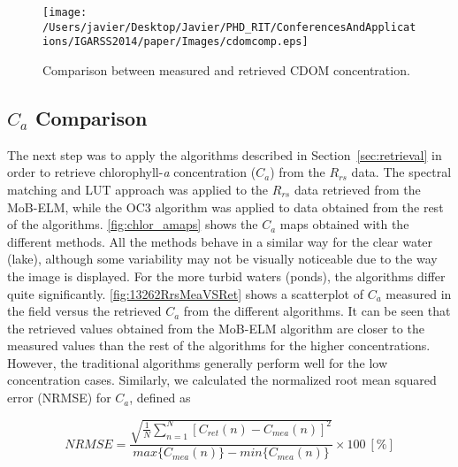 \begin{figure}[htb]
\centering
    \texttt{[image: /Users/javier/Desktop/Javier/PHD\_RIT/ConferencesAndApplications/IGARSS2014/paper/Images/cdomcomp.eps]}    
    \caption{Comparison between measured and retrieved CDOM concentration.}
    \label{fig:cdomcomp} 
\end{figure}  

\subsection{$C_a$ Comparison}
The next step was to apply the algorithms described in Section~\ref{sec:retrieval} in order to retrieve chlorophyll-{\it a} concentration ($C_a$) from the $R_{rs}$ data. The spectral matching and LUT approach was applied to the $R_{rs}$ data retrieved from the MoB-ELM, while the OC3 algorithm was applied to data obtained from the rest of the algorithms. \autoref{fig:chlor_amaps} shows the $C_a$ maps obtained with the different methods. All the methods behave in a similar way for the clear water (lake), although some variability may not be visually noticeable due to the way the image is displayed. For the more turbid waters (ponds), the algorithms differ quite significantly. \autoref{fig:13262RrsMeaVSRet} shows a scatterplot of $C_a$ measured in the field versus the retrieved $C_a$ from the different algorithms. It can be seen that the retrieved values obtained from the MoB-ELM algorithm are closer to the measured values than the rest of the algorithms for the higher concentrations. However, the traditional algorithms generally perform well for the low concentration cases. Similarly, we calculated the normalized root mean squared error (NRMSE) for $C_a$, defined as

\begin{equation}
\label{eq:NRMSEchl}
  NRMSE =\frac{\sqrt{\frac{1}{N}\sum_{n=1}^N{\left[C_{ret}(n) - C_{mea}(n)\right]^2}}}{max\{C_{mea}(n)\} - min\{C_{mea}(n)\}}\times100 ~[\%]
\end{equation}

